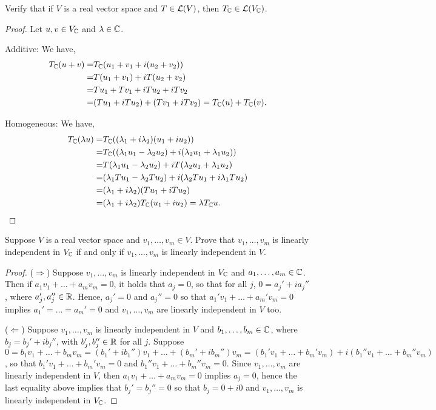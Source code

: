 \begin{exercise}{2}
  Verify that if $V$ is a real vector space and $T\in\mathcal{L}(V)$, then $T_{\mathbb{C}}\in\mathcal{L}(V_{\mathbb{C}})$.
\end{exercise}
\begin{proof}
Let $u,v\in V_{\mathbb{C}}$ and $\lambda\in\mathbb{C}$.
 
 Additive: We have,
 \begin{align*}
    T_{\mathbb{C}}(u+v) =& 
    T_{\mathbb{C}}(u_1+v_1+i(u_2+v_2))\\ 
    =&  T(u_1+v_1) + iT(u_2+v_2)\\
    =&  Tu_1+Tv_1 + iTu_2+iTv_2\\
    =&  (Tu_1+iTu_2)+ (Tv_1+iTv_2) =T_{\mathbb{C}}(u) +T_{\mathbb{C}}(v).
 \end{align*}

 Homogeneous: We have,
 \begin{align*}
     T_{\mathbb{C}}(\lambda u) =& 
     T_{\mathbb{C}}((\lambda_1+i\lambda_2)(u_1+iu_2))\\
     =& T_{\mathbb{C}}((\lambda_1u_1-\lambda_2u_2)+i(\lambda_2u_1+\lambda_1u_2))\\
     =& T(\lambda_1u_1-\lambda_2u_2)+iT(\lambda_2u_1+\lambda_1u_2)\\
     =& (\lambda_1Tu_1-\lambda_2Tu_2)+i(\lambda_2Tu_1+i\lambda_1Tu_2)\\
     =& (\lambda_1+i\lambda_2)(Tu_1+iTu_2)\\
     =& (\lambda_1+i\lambda_2)T_{\mathbb{C}}(u_1+iu_2) =\lambda T_{\mathbb{C}} u.
 \end{align*}
\end{proof}

\begin{exercise}{3}
  Suppose $V$ is a real vector space and $v_1,\dots,v_m\in V$. Prove that $v_1,\dots,v_m$ is linearly independent in $V_{\mathbb{C}}$ if and only if $v_1,\dots,v_m$ is linearly independent in $V$.
\end{exercise}
\begin{proof}
 ($\Rightarrow$) Suppose $v_1,\dots,v_m$ is linearly independent in $V_{\mathbb{C}}$ and $a_1,\dots,a_m\in\mathbb{C}$. Then if $a_1v_1+\dots+a_mv_m =0$, it holds that $a_j=0$, so that for all $j$, $0=a_j'+ia_j''$, where $a_j',a_j''\in\mathbb{R}$. Hence, $a_j'=0$ and $a_j''=0$ so that $a_1'v_1+\dots+a_m'v_m =0$ implies $a_1'=\dots=a_m'=0$ and $v_1,\dots,v_m$ are linearly independent in $V$ too.

 ($\Leftarrow$) Suppose $v_1,\dots,v_m$ is linearly independent in $V$ and $b_1,\dots,b_m\in\mathbb{C}$, where $b_j=b_j'+ib_j''$, with $b_j', b_j''\in\mathbb{R}$ for all $j$. Suppose $0 =b_1v_1+\dots+b_mv_m =(b_1'+ib_1'')v_1+\dots+(b_m'+ib_m'')v_m =(b_1'v_1+\dots+b_m'v_m) +i(b_1''v_1+\dots+b_m''v_m)$, so that $b_1'v_1+\dots+b_m'v_m=0$ and $b_1''v_1+\dots+b_m''v_m=0$. Since $v_1,\dots,v_m$ are linearly independent in $V$, then $a_1v_1+\dots+a_mv_m =0$ implies $a_j=0$, hence the last equality above implies that $b_j'=b_j''=0$ so that $b_j=0+i0$ and $v_1,\dots,v_m$ is linearly independent in $V_{\mathbb{C}}$.
\end{proof}

